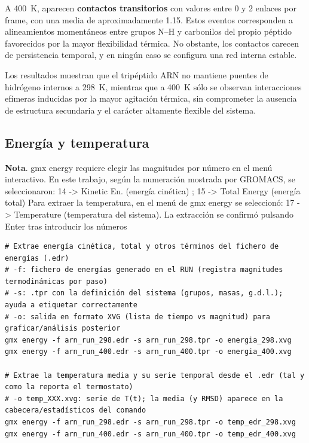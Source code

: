 \documentclass[12pt,a4paper]{article}
\begin{document}
A \SI{400}{K}, aparecen \textbf{contactos transitorios} con valores entre 0 y 2 enlaces por frame, con una media
de aproximadamente 1.15. Estos eventos corresponden a alineamientos momentáneos entre grupos N–H y
carbonilos del propio péptido favorecidos por la mayor flexibilidad térmica. No obstante, los contactos carecen
de persistencia temporal, y en ningún caso se configura una red interna estable.

Los resultados muestran que el tripéptido ARN no mantiene puentes de hidrógeno internos a
\SI{298}{K}, mientras que a \SI{400}{K} sólo se observan interacciones efímeras inducidas por la mayor agitación
térmica, sin comprometer la ausencia de estructura secundaria y el carácter altamente flexible del sistema.

\subsection{Energía y temperatura}

\noindent\textbf{Nota}. gmx energy requiere elegir las magnitudes por número en el menú interactivo. En este trabajo, según la numeración mostrada por GROMACS, se seleccionaron:
14 -> Kinetic En. (energía cinética) ; 
15 -> Total Energy (energía total)
Para extraer la temperatura, en el menú de gmx energy se seleccionó:
17 -> Temperature (temperatura del sistema). 
La extracción se confirmó pulsando Enter tras introducir los números

\begin{lstlisting}[style=bashstyle]
# Extrae energía cinética, total y otros términos del fichero de energías (.edr)
# -f: fichero de energías generado en el RUN (registra magnitudes termodinámicas por paso)
# -s: .tpr con la definición del sistema (grupos, masas, g.d.l.); ayuda a etiquetar correctamente
# -o: salida en formato XVG (lista de tiempo vs magnitud) para graficar/análisis posterior
gmx energy -f arn_run_298.edr -s arn_run_298.tpr -o energia_298.xvg
gmx energy -f arn_run_400.edr -s arn_run_400.tpr -o energia_400.xvg

# Extrae la temperatura media y su serie temporal desde el .edr (tal y como la reporta el termostato)
# -o temp_XXX.xvg: serie de T(t); la media (y RMSD) aparece en la cabecera/estadísticos del comando
gmx energy -f arn_run_298.edr -s arn_run_298.tpr -o temp_edr_298.xvg
gmx energy -f arn_run_400.edr -s arn_run_400.tpr -o temp_edr_400.xvg
\end{lstlisting}
\end{document}
